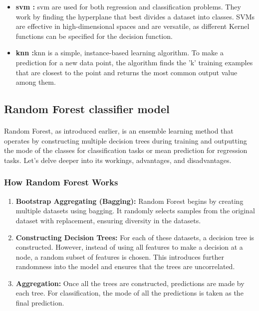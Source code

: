 \begin{itemize}
        \item \textbf{\acrfull{svm}\cite{wu_analysis_2006} : }\acrshort{svm} are used for both regression and classification problems. They work by finding the hyperplane that best divides a dataset into classes. SVMs are effective in high-dimensional spaces and are versatile, as different Kernel functions can be specified for the decision function.
        
        \item \textbf{\acrfull{knn}\cite{laaksonen_classification_1996} :}\acrshort{knn} is a simple, instance-based learning algorithm. To make a prediction for a new data point, the algorithm finds the 'k' training examples that are closest to the point and returns the most common output value among them.
    \end{itemize}


    \subsection{Random Forest classifier model}\label{seq:background:random_forest}

        \paragraph{}Random Forest, as introduced earlier, is an ensemble learning method that operates by constructing multiple decision trees during training and outputting the mode of the classes for classification tasks or mean prediction for regression tasks. Let's delve deeper into its workings, advantages, and disadvantages.

        \subsubsection{How Random Forest Works}

        \begin{enumerate}
            \item \textbf{Bootstrap Aggregating (Bagging):} Random Forest begins by creating multiple datasets using bagging. It randomly selects samples from the original dataset with replacement, ensuring diversity in the datasets.
            
            \item \textbf{Constructing Decision Trees:} For each of these datasets, a decision tree is constructed. However, instead of using all features to make a decision at a node, a random subset of features is chosen. This introduces further randomness into the model and ensures that the trees are uncorrelated.
            
            \item \textbf{Aggregation:} Once all the trees are constructed, predictions are made by each tree. For classification, the mode of all the predictions is taken as the final prediction.
        \end{enumerate}

